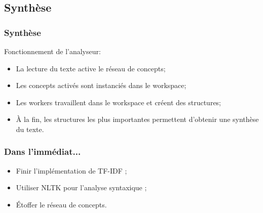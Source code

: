 \documentclass{beamer}
\begin{document}
    \subsection{Synthèse}
        \begin{frame}
        \frametitle{Synthèse}
            Fonctionnement de l'analyseur:
            \begin{itemize}
                \item La lecture du texte active le réseau de concepts;
                \item Les concepts activés sont instanciés dans le workspace;
                \item Les workers travaillent dans le workspace et créent des structures;
                \item À la fin, les structures les plus importantes permettent d'obtenir une synthèse du texte.
            \end{itemize}
        \end{frame}

\begin{frame}
	\frametitle{Dans l'immédiat...}
	\begin{itemize}
		\item Finir l'implémentation de TF-IDF ;
		\item Utiliser NLTK pour l'analyse syntaxique ;
		\item Étoffer le réseau de concepts.
	\end{itemize}
\end{frame}
\end{document}
